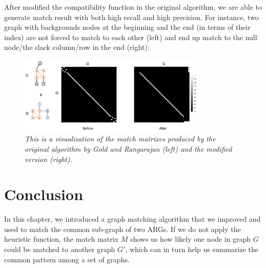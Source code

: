 After modified the compatibility function in the original algorithm, we are able to generate match result with both high recall and high precision. For instance, two graph with backgrounds nodes at the beginning and the end (in terms of their index) are not forced to match to each other (left) and end up match to the null node/the slack column/row in the end (right):
\begin{figure}[h]
	\centering
	\captionsetup{justification=centering}
	\includegraphics[width=0.8\textwidth]{figs/null_node_improve.png}
	\caption[Caption for LOF]{\emph{This is a visualization of the match matrixes produced by the original algorithm by Gold and Rangarajan (left) and the modified version (right).}}
	\label{fig:null_node_improve}
\end{figure}

\section{Conclusion}

In this chapter, we introduced a graph matching algorithm that we improved and used to match the common sub-graph of two ARGs. If we do not apply the heuristic function, the match matrix $M$ shows us how likely one node in graph $G$ could be matched to another graph $G'$, which can in turn help us summarize the common pattern among a set of graphs.

